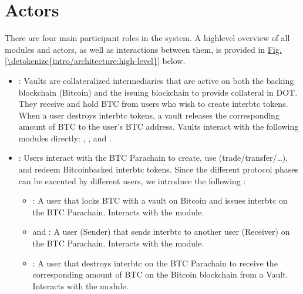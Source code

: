 \documentclass[a4paper,10pt,english]{sphinxmanual}
\begin{document}
\section{Actors}
\label{\detokenize{intro/architecture:actors}}
There are four main participant roles in the system. A high\sphinxhyphen{}level overview of all modules and actors, as well as interactions between them, is provided in \hyperref[\detokenize{intro/architecture:high-level}]{Fig.\@ \ref{\detokenize{intro/architecture:high-level}}} below.
\begin{itemize}
\item {} 
: Vaults are collateralized intermediaries that are active on both the backing blockchain (Bitcoin) and the issuing blockchain to provide collateral in DOT. They receive and hold BTC from users who wish to create interbtc tokens. When a user destroys interbtc tokens, a vault releases the corresponding amount of BTC to the user’s BTC address. Vaults interact with the following modules directly: {\hyperref[\detokenize{spec/vault-registry:vault-registry}]{}}, {\hyperref[\detokenize{spec/redeem:redeem-protocol}]{}}, and {\hyperref[\detokenize{spec/replace:replace-protocol}]{}}.

\item {} 
: Users interact with the BTC Parachain to create, use (trade/transfer/…), and redeem Bitcoin\sphinxhyphen{}backed interbtc tokens. Since the different protocol phases can be executed by different users, we introduce the following :
\begin{itemize}
\item {} 
: A user that locks BTC with a vault on Bitcoin and issues interbtc on the BTC Parachain. Interacts with the {\hyperref[\detokenize{spec/issue:issue-protocol}]{}} module.

\item {} 
 and : A user (Sender) that sends interbtc to another user (Receiver) on the BTC Parachain. Interacts with the {\hyperref[\detokenize{spec/treasury:treasury-module}]{}} module.

\item {} 
: A user that destroys interbtc on the BTC Parachain to receive the corresponding amount of BTC on the Bitcoin blockchain from a Vault. Interacts with the {\hyperref[\detokenize{spec/redeem:redeem-protocol}]{}} module.


\end{itemize}
\end{itemize}
\end{document}
